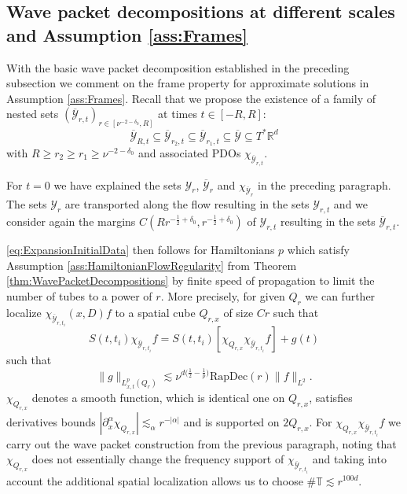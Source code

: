 \documentclass{amsart}
\theoremstyle{definition}
\newcommand{\R}{\mathbb{R}}
\newcommand{\T}{\mathbb{T}}
\begin{document}
\subsection{Wave packet decompositions at different scales and Assumption \ref{ass:Frames}}
\label{subsection:WavePacketDecompositions}

With the basic wave packet decomposition established in the preceding subsection we comment on the frame property for approximate solutions in Assumption \ref{ass:Frames}. Recall that we propose the existence of a family of nested sets $(\overline{\mathcal{Y}}_{r,t})_{r \in [\nu^{-2-\delta_0},R]}$ at times $t \in [-R,R]$:
\begin{equation*}
    \overline{\mathcal{Y}}_{R,t} \subseteq \overline{\mathcal{Y}}_{r_2,t} \subseteq \overline{\mathcal{Y}}_{r_1,t} \subseteq \overline{\mathcal{Y}} \subseteq T^* \R^d
\end{equation*}
with $R \geq r_2 \geq r_1 \geq \nu^{-2-\delta_0}$ and associated PDOs $\chi_{\overline{\mathcal{Y}}_{r,t}}$.

For $t= 0$ we have explained the sets $\mathcal{Y}_r$, $\overline{\mathcal{Y}}_r$ and $\chi_{\overline{\mathcal{Y}}_r}$ in the preceding paragraph. The sets $\mathcal{Y}_r$ are transported along the flow resulting in the sets $\mathcal{Y}_{r,t}$ and we consider again the margins $C(R r^{-\frac{1}{2}+\delta_0},r^{-\frac{1}{2}+\delta_0})$ of $\mathcal{Y}_{r,t}$ resulting in the sets $\overline{\mathcal{Y}}_{r,t}$.

\eqref{eq:ExpansionInitialData} then follows for Hamiltonians $p$ which satisfy Assumption \ref{ass:HamiltonianFlowRegularity} from Theorem \ref{thm:WavePacketDecompositions} by finite speed of propagation to limit the number of tubes to a power of $r$. More precisely, for given $Q_r$ we can further localize $\chi_{\overline{\mathcal{Y}}_{r,t_i}}(x,D) f$ to a spatial cube $Q_{r,x}$ of size $Cr$ such that
\begin{equation*}
    S(t,t_i) \chi_{\overline{\mathcal{Y}}_{r,t_i}} f = S(t,t_i) [\chi_{Q_{r,x}} \chi_{\overline{\mathcal{Y}}_{r,t_i}} f] + g(t)
\end{equation*}
such that
\begin{equation*}
    \| g \|_{L^p_{x,t}(Q_r)} \lesssim \nu^{d \big( \frac12 - \frac1p \big)} \text{RapDec}(r) \|f \|_{L^2}.
\end{equation*}
$\chi_{Q_{r,x}}$ denotes a smooth function, which is identical one on $Q_{r,x}$, satisfies derivatives bounds $|\partial_x^{\alpha} \chi_{Q_{r,x}}| \lesssim_{\alpha} r^{-|\alpha|}$ and is supported on $2 Q_{r,x}$.
For $\chi_{Q_{r,x}} \chi_{\overline{\mathcal{Y}}_{r,t_i}} f$ we carry out the wave packet construction from the previous paragraph, noting that $\chi_{Q_{r,x}}$ does not essentially change the frequency support of $\chi_{\overline{\mathcal{Y}}_{r,t_i}}$ and taking into account the additional spatial localization allows us to choose $\# \T \lesssim r^{100d}$.
\end{document}

